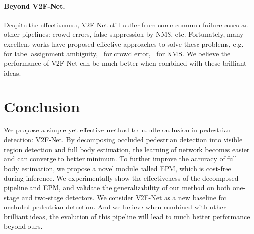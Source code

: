 \documentclass[10pt,twocolumn,letterpaper]{article}
\begin{document}
\paragraph{Beyond V2F-Net.} Despite the effectiveness, V2F-Net still suffer from some common failure cases as other pipelines: crowd errors, false suppression by NMS, etc. Fortunately, many excellent works have proposed effective approaches to solve these problems, e.g.~\cite{chu2020crowddet} for label assignment ambiguity,~\cite{wang2018repulsion,zhang2018Occlusionaware} for crowd error,~\cite{adaptiveNMS, Noh_2018_CVPR, xie2020count} for NMS. We believe the performance of V2F-Net can be much better when combined with these brilliant ideas.

\section{Conclusion}
We propose a simple yet effective method to handle occlusion in pedestrian detection: V2F-Net. By decomposing occluded pedestrian detection into visible region detection and full body estimation, the learning of network becomes easier and can converge to better minimum. To further improve the accuracy of full body estimation, we propose a novel module called EPM, which is cost-free during inference. We experimentally show the effectiveness of the decomposed pipeline and EPM, and validate the generalizability of our method on both one-stage and two-stage detectors. We consider V2F-Net as a new baseline for occluded pedestrian detection. And we believe when combined with other brilliant ideas, the evolution of this pipeline will lead to much better performance beyond ours.


{\small


}
\end{document}
